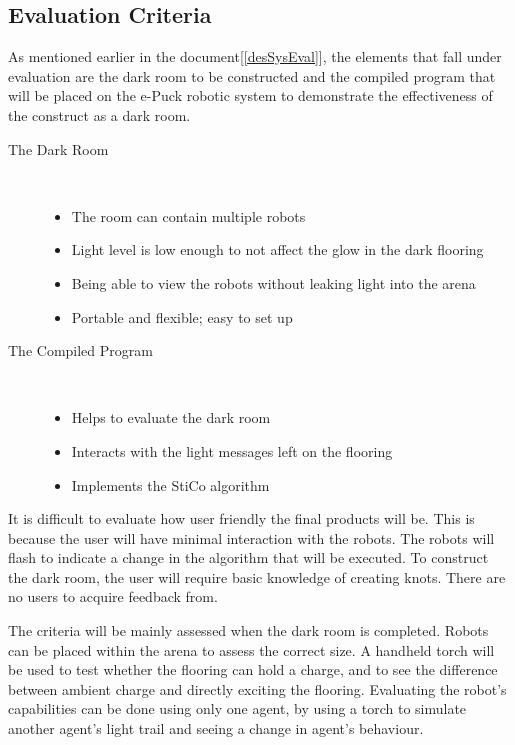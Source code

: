 \subsection{Evaluation Criteria} \label{desEvalCrit}
As mentioned earlier in the document[\ref{desSysEval}], the elements that fall
under evaluation are the dark room to be constructed and the compiled program
that will be placed on the e-Puck robotic system to demonstrate the 
effectiveness of the construct as a dark room.

\begin{description}
  \item[The Dark Room] \hfill \\
  \begin{itemize}
    \item The room can contain multiple robots
    \item Light level is low enough to not affect the glow in the dark flooring
    \item Being able to view the robots without leaking light into the arena
    \item Portable and flexible; easy to set up
  \end{itemize}
  \item[The Compiled Program] \hfill \\
  \begin{itemize}
    \item Helps to evaluate the dark room
    \item Interacts with the light messages left on the flooring
    \item Implements the StiCo algorithm
  \end{itemize}
\end{description}

It is difficult to evaluate how user friendly the final products will be.  This
is because the user will have minimal interaction with the robots.  The robots
will flash to indicate a change in the algorithm that will be executed.  To
construct the dark room, the user will require basic knowledge of creating
knots.  There are no users to acquire feedback from.

The criteria will be mainly assessed when the dark room is completed.  Robots
can be placed within the arena to assess the correct size.  A handheld torch
will be used to test whether the flooring can hold a charge, and to see the
difference between ambient charge and directly exciting the flooring.
Evaluating the robot's capabilities can be done using only one agent, by using
a torch to simulate another agent's light trail and seeing a change in
agent's behaviour.

